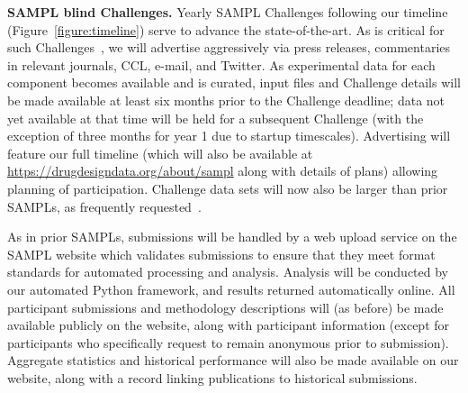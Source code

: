 \documentclass[11pt]{article}
\begin{document}
\textbf{SAMPL blind Challenges.} Yearly SAMPL Challenges following our timeline (Figure~\ref{figure:timeline}) serve to advance the state-of-the-art.
As is critical for such Challenges~\cite{Saez-Rodriguez:2016:NatRevGenet}, we will advertise aggressively via press releases, commentaries in relevant journals, CCL, e-mail, and Twitter. 
As experimental data for each component becomes available and is curated, input files and Challenge details will be made available at least six months prior to the Challenge deadline; data not yet available at that time will be held for a subsequent Challenge (with the exception of three months for year 1 due to startup timescales).
Advertising will feature our full timeline (which will also be available at \url{https://drugdesigndata.org/about/sampl} along with details of plans) allowing planning of participation. 
Challenge data sets will now also be larger than prior SAMPLs, as frequently requested~\cite{Mobley:2017:eScholarship}. 


As in prior SAMPLs, submissions will be handled by a web upload service on the SAMPL website which validates submissions to ensure that they meet format standards for automated processing and analysis. 
Analysis will be conducted by our automated Python framework, and results returned automatically online.
All participant submissions and methodology descriptions will (as before) be made available publicly on the website, along with participant information (except for participants who specifically request to remain anonymous prior to submission).
Aggregate statistics and historical performance will also be made available on our website, along with a record linking publications to historical submissions.
\end{document}
